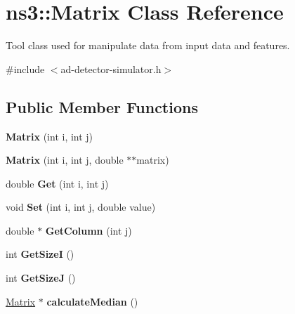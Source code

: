 \hypertarget{classns3_1_1Matrix}{}\section{ns3\+:\+:Matrix Class Reference}
\label{classns3_1_1Matrix}


Tool class used for manipulate data from input data and features.  




{\ttfamily \#include $<$ad-\/detector-\/simulator.\+h$>$}

\subsection*{Public Member Functions}
\begin{DoxyCompactItemize}
\item 
\hypertarget{classns3_1_1Matrix_ad3d8e98cf38341d6f86e323d1023262b}{}{\bfseries Matrix} (int i, int j)\label{classns3_1_1Matrix_ad3d8e98cf38341d6f86e323d1023262b}

\item 
\hypertarget{classns3_1_1Matrix_a5789d04403876fa237a8bb296269ca22}{}{\bfseries Matrix} (int i, int j, double $\ast$$\ast$matrix)\label{classns3_1_1Matrix_a5789d04403876fa237a8bb296269ca22}

\item 
\hypertarget{classns3_1_1Matrix_a25ea943b98a1b83efb7d83ec6ae6466b}{}double {\bfseries Get} (int i, int j)\label{classns3_1_1Matrix_a25ea943b98a1b83efb7d83ec6ae6466b}

\item 
\hypertarget{classns3_1_1Matrix_a0f212025e7214e916a975c4173c10fcb}{}void {\bfseries Set} (int i, int j, double value)\label{classns3_1_1Matrix_a0f212025e7214e916a975c4173c10fcb}

\item 
\hypertarget{classns3_1_1Matrix_aef6f01e12685037182b14024b51e52e5}{}double $\ast$ {\bfseries Get\+Column} (int j)\label{classns3_1_1Matrix_aef6f01e12685037182b14024b51e52e5}

\item 
\hypertarget{classns3_1_1Matrix_a17336769c5c2935b7e14fd56048d97f4}{}int {\bfseries Get\+Size\+I} ()\label{classns3_1_1Matrix_a17336769c5c2935b7e14fd56048d97f4}

\item 
\hypertarget{classns3_1_1Matrix_a3142390857495a7f5f7a52b8ad97a727}{}int {\bfseries Get\+Size\+J} ()\label{classns3_1_1Matrix_a3142390857495a7f5f7a52b8ad97a727}

\item 
\hypertarget{classns3_1_1Matrix_a858a615fe4323a71bbec529159386f49}{}\hyperlink{classns3_1_1Matrix}{Matrix} $\ast$ {\bfseries calculate\+Median} ()\label{classns3_1_1Matrix_a858a615fe4323a71bbec529159386f49}

\end{DoxyCompactItemize}
